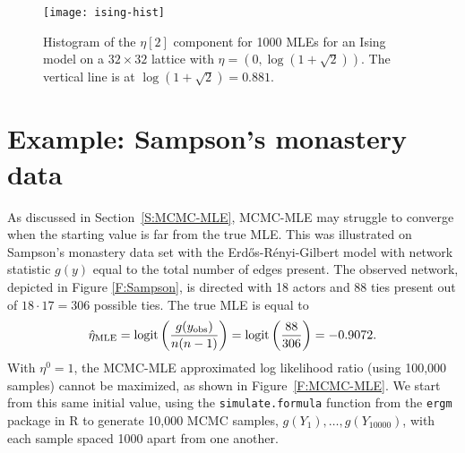 \begin{figure}[h!]
\begin{center}
\texttt{[image: ising-hist]}
\end{center}
\caption[Histogram of the $\eta$ component for 1000 MLEs for an Ising model on a $32 \times 32$ lattice with $\eta$ at phase transition value.]
{Histogram of the $\eta[2]$ component for 1000 MLEs for 
an Ising model on a $32 \times 32$ lattice with $\eta = \left(0, \log(1 + \sqrt{2}) 
\right)$.  The vertical line is at $\log(1 + \sqrt{2}) = 0.881$. }
\label{F:ising-hist}
\end{figure}

%
%
%

\section{Example: Sampson's monastery data} \label{S:Example:Sampson}
As discussed in Section~\ref{S:MCMC-MLE}, MCMC-MLE may struggle to converge when the 
starting value is far from the true MLE.  This was illustrated on Sampson's monastery data set with the Erd\H{o}s-R\'{e}nyi-Gilbert model with network statistic $g(y)$ equal to 
the total number of edges present.
The observed network, depicted in Figure \ref{F:Sampson}, is directed with 18 actors and 
88 ties present out of $18 \cdot 17=306$ possible ties.  The true MLE is equal to 
\begin{align*}
	\hat{\eta}_{\textrm{MLE}} = \operatorname{logit}\left( \frac{g(y_{\text{obs}})}{n(n-1)}\right) = \operatorname{logit} \left( \frac{88}{306}\right ) = -0.9072.
\end{align*}
With $\eta^0 = 1$, the MCMC-MLE approximated log likelihood ratio (using 100,000 samples) 
cannot be maximized, as shown in Figure~\ref{F:MCMC-MLE}.
We start from this same initial value, using the \texttt{simulate.formula} function
from the \texttt{ergm} package in R to generate 10,000 MCMC samples, $g(Y_1), \ldots, g(Y_
{10000})$, with each sample spaced 1000 apart from one another.

